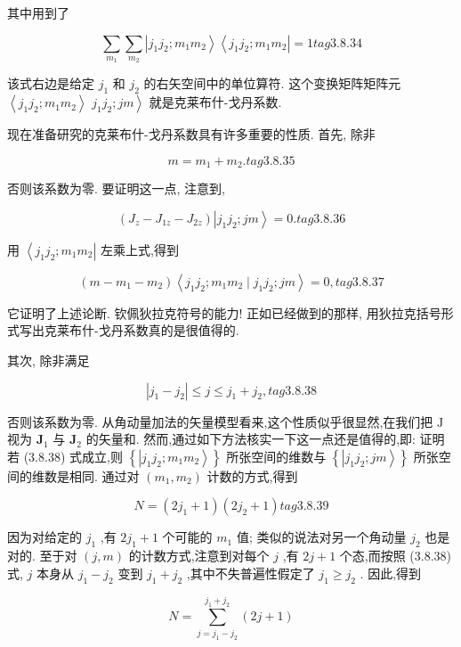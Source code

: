 其中用到了

$$
\mathop{\sum }\limits_{{m}_{1}}\mathop{\sum }\limits_{{m}_{2}}\left| {{j}_{1}{j}_{2};{m}_{1}{m}_{2}}\right\rangle \left\langle {{j}_{1}{j}_{2};{m}_{1}{m}_{2}}\right| = 1 tag{3. 8.34}
$$

该式右边是给定 ${j}_{1}$ 和 ${j}_{2}$ 的右矢空间中的单位算符. 这个变换矩阵矩阵元 $\left\langle {{j}_{1}{j}_{2};{m}_{1}{m}_{2}}\right\rangle$ $\left. {{j}_{1}{j}_{2};{jm}}\right\rangle$ 就是克莱布什-戈丹系数.

现在准备研究的克莱布什-戈丹系数具有许多重要的性质. 首先, 除非

$$
m = {m}_{1} + {m}_{2}. tag{3.8.35}
$$

否则该系数为零. 要证明这一点, 注意到,

$$
\left( {{J}_{z} - {J}_{1z} - {J}_{2z}}\right) \left| {{j}_{1}{j}_{2};{jm}}\right\rangle = 0. tag{3.8.36}
$$

用 $\left\langle {{j}_{1}{j}_{2};{m}_{1}{m}_{2}}\right|$ 左乘上式,得到

$$
\left( {m - {m}_{1} - {m}_{2}}\right) \left\langle {{j}_{1}{j}_{2};{m}_{1}{m}_{2} \mid {j}_{1}{j}_{2};{jm}}\right\rangle = 0, tag{3.8.37}
$$

它证明了上述论断. 钦佩狄拉克符号的能力! 正如已经做到的那样, 用狄拉克括号形式写出克莱布什-戈丹系数真的是很值得的.

其次, 除非满足

$$
\left| {{j}_{1} - {j}_{2}}\right| \leq j \leq {j}_{1} + {j}_{2}, tag{3.8.38}
$$

否则该系数为零. 从角动量加法的矢量模型看来,这个性质似乎很显然,在我们把 $\mathrm{J}$ 视为 ${\mathbf{J}}_{1}$ 与 ${\mathbf{J}}_{2}$ 的矢量和. 然而,通过如下方法核实一下这一点还是值得的,即: 证明若 (3.8.38) 式成立,则 $\left\{ \left| {{j}_{1}{j}_{2};{m}_{1}{m}_{2}}\right\rangle \right\}$ 所张空间的维数与 $\left\{ \left| {{j}_{1}{j}_{2};{jm}}\right\rangle \right\}$ 所张空间的维数是相同. 通过对 $\left( {{m}_{1},{m}_{2}}\right)$ 计数的方式,得到

$$
N = \left( {2{j}_{1} + 1}\right) \left( {2{j}_{2} + 1}\right) tag{3.8.39}
$$

因为对给定的 ${j}_{1}$ ,有 $2{j}_{1} + 1$ 个可能的 ${m}_{1}$ 值; 类似的说法对另一个角动量 ${j}_{2}$ 也是对的. 至于对 $\left( {j, m}\right)$ 的计数方式,注意到对每个 $j$ ,有 ${2j} + 1$ 个态,而按照 (3.8.38) 式, $j$ 本身从 ${j}_{1} - {j}_{2}$ 变到 ${j}_{1} + {j}_{2}$ ,其中不失普遍性假定了 ${j}_{1} \geq {j}_{2}$ . 因此,得到

$$
N = \mathop{\sum }\limits_{{j = {j}_{1} - {j}_{2}}}^{{{j}_{1} + {j}_{2}}}\left( {{2j} + 1}\right)
$$

